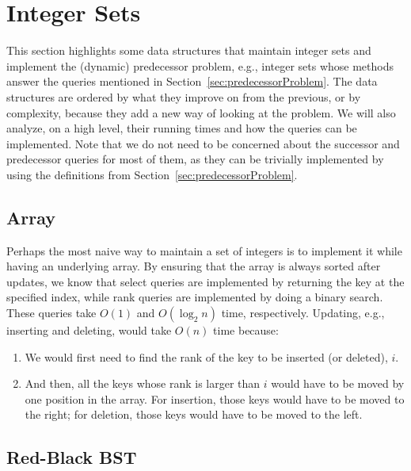 \newpage
\section{Integer Sets} \label{sec:IntegerSets}

This section highlights some data structures that maintain integer sets and implement the (dynamic) predecessor problem, e.g., integer sets whose methods answer the queries mentioned in Section~\ref{sec:predecessorProblem}.
The data structures are ordered by what they improve on from the previous, or by complexity, because they add a new way of looking at the problem.
We will also analyze, on a high level, their running times and how the queries can be implemented.
Note that we do not need to be concerned about the successor and predecessor queries for most of them, as they can be trivially implemented by using the definitions from Section~\ref{sec:predecessorProblem}.

\subsection{Array} \label{sec:array}

Perhaps the most naive way to maintain a set of integers is to implement it while having an underlying array. By ensuring that the array is always sorted after updates, we know that select queries are implemented by returning the key at the specified index, while rank queries are implemented by doing a binary search. These queries take $O(1)$ and $O(\log_2 n)$ time, respectively. Updating, e.g., inserting and deleting, would take $O(n)$ time because:
\begin{enumerate}
    \item
    We would first need to find the rank of the key to be inserted (or deleted), $i$.
    
    \item
    And then, all the keys whose rank is larger than $i$ would have to be moved by one position in the array. For insertion, those keys would have to be moved to the right; for deletion, those keys would have to be moved to the left.
\end{enumerate}

\subsection{Red-Black BST}

